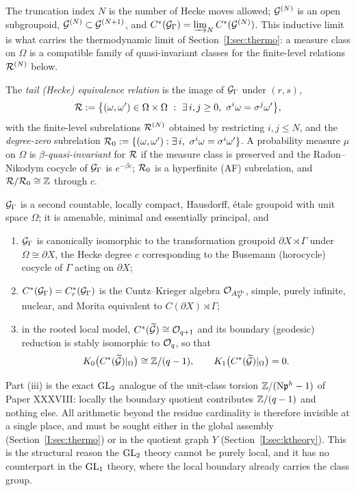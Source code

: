 The truncation index $N$ is the number of Hecke moves allowed; $\mathcal{G}^{(N)}$ is an open
subgroupoid, $\mathcal{G}^{(N)}\subset\mathcal{G}^{(N+1)}$, and $C^*(\mathcal{G}_\Gamma)=\varinjlim_N C^*(\mathcal{G}^{(N)})$.
This inductive limit is what carries the thermodynamic limit of
Section~\ref{I:sec:thermo}: a measure class on $\Omega$ is a compatible family of
quasi-invariant classes for the finite-level relations $\mathcal{R}^{(N)}$ below.

\begin{definition}\label{I:def:tail}
The \emph{tail (Hecke) equivalence relation} is the image of $\mathcal{G}_\Gamma$ under
$(r,s)$,
\[
\cR:=\bigl\{(\omega,\omega')\in\Omega\times\Omega\ :\ \exists\, i,j\ge0,\
\sigma^i\omega=\sigma^j\omega'\bigr\},
\]
with the finite-level subrelations $\mathcal{R}^{(N)}$ obtained by restricting $i,j\le N$, and
the \emph{degree-zero} subrelation $\cR_0:=\{(\omega,\omega'):\exists\,i,\ \sigma^i\omega=\sigma^i\omega'\}$.
A probability measure $\mu$ on $\Omega$ is \emph{$\beta$-quasi-invariant} for $\mathcal{R}$ if
the measure class is preserved and the Radon--Nikodym cocycle of $\mathcal{G}_\Gamma$ is
$e^{-\beta c}$; $\mathcal{R}_0$ is a hyperfinite (AF) subrelation, and $\mathcal{R}/\mathcal{R}_0\cong\mathbb{Z}$ through
$c$.
\end{definition}

\begin{proposition}\label{I:prop:groupoid}
$\mathcal{G}_\Gamma$ is a second countable, locally compact, Hausdorff, \'etale groupoid with
unit space $\Omega$; it is amenable, minimal and essentially principal, and
\begin{enumerate}
\item[(i)] $\mathcal{G}_\Gamma$ is canonically isomorphic to the transformation groupoid
$\partial X\rtimes\Gamma$ under $\Omega\cong\partial X$, the Hecke degree $c$
corresponding to the Busemann (horocycle) cocycle of $\Gamma$ acting on $\partial X$;
\item[(ii)] $C^*(\mathcal{G}_\Gamma)=C^*_r(\mathcal{G}_\Gamma)$ is the Cuntz--Krieger algebra
$\mathcal{O}_{A^{\mathrm{nb}}_Y}$, simple, purely infinite, nuclear, and Morita equivalent to
$C(\partial X)\rtimes\Gamma$;
\item[(iii)] in the rooted local model, $C^*(\widetilde{\mathcal{G}})\cong\mathcal{O}_{q+1}$ and its
boundary (geodesic) reduction is stably isomorphic to $\mathcal{O}_q$, so that
\[
K_0\bigl(C^*(\widetilde{\mathcal{G}})|_\Omega\bigr)\cong\mathbb{Z}/(q-1),\qquad
K_1\bigl(C^*(\widetilde{\mathcal{G}})|_\Omega\bigr)=0 .
\]
\end{enumerate}
\end{proposition}

\begin{remark}\label{I:rem:unitclass}
Part (iii) is the exact $\mathrm{GL}_2$ analogue of the unit-class torsion $\mathbb{Z}/(\mathrm{N}\mathfrak{p}^h-1)$ of
Paper XXXVIII: locally the boundary quotient contributes $\mathbb{Z}/(q-1)$ and nothing else. All
arithmetic beyond the residue cardinality is therefore invisible at a single place, and
must be sought either in the global assembly (Section~\ref{I:sec:thermo}) or in the
quotient graph $Y$ (Section~\ref{I:sec:ktheory}). This is the structural reason the
$\mathrm{GL}_2$ theory cannot be purely local, and it has no counterpart in the $\mathrm{GL}_1$ theory,
where the local boundary already carries the class group.
\end{remark}

